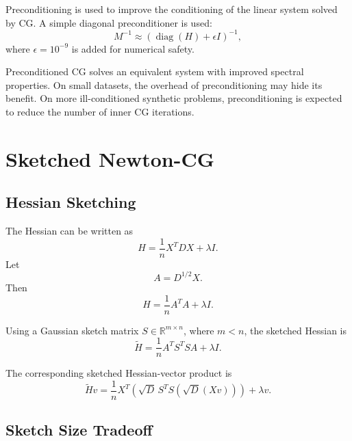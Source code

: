 \documentclass[12pt,a4paper]{report}
\begin{document}
Preconditioning is used to improve the conditioning of the linear system solved by CG. A simple diagonal preconditioner is used:
\begin{equation}
    M^{-1}
    \approx
    \left(\operatorname{diag}(H)+\epsilon I\right)^{-1},
\end{equation}
where \(\epsilon=10^{-9}\) is added for numerical safety.

Preconditioned CG solves an equivalent system with improved spectral properties. On small datasets, the overhead of preconditioning may hide its benefit. On more ill-conditioned synthetic problems, preconditioning is expected to reduce the number of inner CG iterations.

\chapter{Sketched Newton-CG}

\section{Hessian Sketching}

The Hessian can be written as
\begin{equation}
    H = \frac{1}{n}X^T D X+\lambda I.
\end{equation}
Let
\begin{equation}
    A = D^{1/2}X.
\end{equation}
Then
\begin{equation}
    H = \frac{1}{n}A^T A+\lambda I.
\end{equation}

Using a Gaussian sketch matrix \(S\in\mathbb{R}^{m\times n}\), where \(m<n\), the sketched Hessian is
\begin{equation}
    \tilde H
    =
    \frac{1}{n}A^T S^TSA+\lambda I.
    \label{eq:sketched_hessian}
\end{equation}

The corresponding sketched Hessian-vector product is
\begin{equation}
    \tilde H v
    =
    \frac{1}{n}
    X^T
    \left(
    \sqrt{D}\,S^T S(\sqrt{D}(Xv))
    \right)
    +
    \lambda v.
    \label{eq:sketched_hvp}
\end{equation}

\section{Sketch Size Tradeoff}
\end{document}
